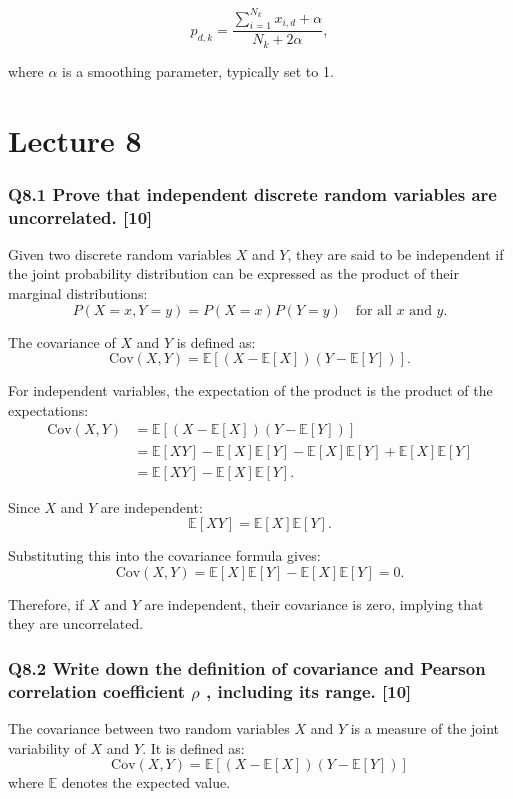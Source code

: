 \documentclass[11pt]{article}
\begin{document}
\[
p_{d,k} = \frac{\sum_{i=1}^{N_k} x_{i,d} + \alpha}{N_k + 2\alpha},
\]

where \( \alpha \) is a smoothing parameter, typically set to 1.

\part{Lecture 8}

\section{Q8.1 Prove that independent discrete random variables are uncorrelated. [10]}

Given two discrete random variables \( X \) and \( Y \), they are said to be independent if the joint probability distribution can be expressed as the product of their marginal distributions:
\[
P(X = x, Y = y) = P(X = x)P(Y = y) \quad \text{for all } x \text{ and } y.
\]

The covariance of \( X \) and \( Y \) is defined as:
\[
\text{Cov}(X, Y) = \mathbb{E}[(X - \mathbb{E}[X])(Y - \mathbb{E}[Y])].
\]

For independent variables, the expectation of the product is the product of the expectations:
\begin{align*}
\text{Cov}(X, Y) &= \mathbb{E}[(X - \mathbb{E}[X])(Y - \mathbb{E}[Y])] \\
&= \mathbb{E}[XY] - \mathbb{E}[X]\mathbb{E}[Y] - \mathbb{E}[X]\mathbb{E}[Y] + \mathbb{E}[X]\mathbb{E}[Y] \\
&= \mathbb{E}[XY] - \mathbb{E}[X]\mathbb{E}[Y].
\end{align*}

Since \( X \) and \( Y \) are independent:
\[
\mathbb{E}[XY] = \mathbb{E}[X]\mathbb{E}[Y].
\]

Substituting this into the covariance formula gives:
\[
\text{Cov}(X, Y) = \mathbb{E}[X]\mathbb{E}[Y] - \mathbb{E}[X]\mathbb{E}[Y] = 0.
\]

Therefore, if \( X \) and \( Y \) are independent, their covariance is zero, implying that they are uncorrelated.

\section{Q8.2 Write down the definition of covariance and Pearson correlation coefficient $\rho$ , including its range. [10]}

The covariance between two random variables \( X \) and \( Y \) is a measure of the joint variability of \( X \) and \( Y \). It is defined as:
\[
\text{Cov}(X, Y) = \mathbb{E}[(X - \mathbb{E}[X])(Y - \mathbb{E}[Y])]
\]
where \( \mathbb{E} \) denotes the expected value.
\end{document}
